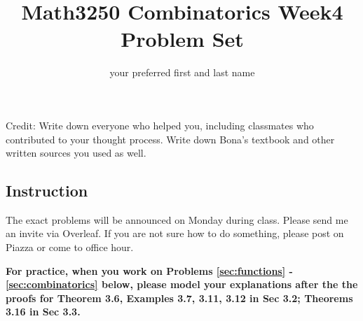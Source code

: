 \documentclass[12pt]{amsart}
\title{Math3250 Combinatorics Week4 Problem Set}
\author{your preferred first and last name}
\date{}
\begin{document}
\maketitle


\noindent Credit: Write down everyone who helped you, including classmates who contributed to your thought process. Write down Bona's textbook and other written sources you used as well.

\subsection*{Instruction}
The exact problems will be announced on Monday during class. Please send me an invite via Overleaf. If you are not sure how to do something, please post on Piazza or come to office hour.

\bigskip 

\noindent \textbf{
For practice, when you work on Problems \ref{sec:functions} - \ref{sec:combinatorics} below, please model your explanations after the the proofs for Theorem 3.6, Examples 3.7, 3.11, 3.12 in Sec 3.2; Theorems 3.16 in Sec 3.3. }


\end{document}

